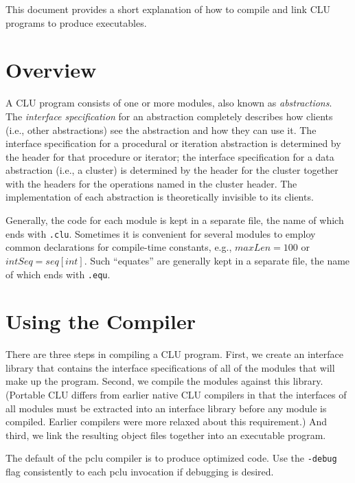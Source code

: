 \maketitle

\noindent This document provides a short explanation of how to compile
and link CLU programs to produce executables.

\section{Overview}

A CLU program consists of one or more modules, also known as {\em
abstractions}.  The {\em interface specification} for an abstraction
completely describes how clients (i.e., other abstractions) see the
abstraction and how they can use it.  The interface specification for
a procedural or iteration abstraction is determined by the header for
that procedure or iterator; the interface specification for a data
abstraction (i.e., a cluster) is determined by the header for the
cluster together with the headers for the operations named in the
cluster header.  The implementation of each abstraction is
theoretically invisible to its clients.

Generally, the code for each module is kept in a separate file, the
name of which ends with \verb|.clu|.  Sometimes it is convenient for
several modules to employ common declarations for compile-time
constants, e.g., $maxLen = 100$ or $intSeq = seq[int]$.  Such
``equates'' are generally kept in a separate file, the name of which
ends with \verb|.equ|.

\section{Using the Compiler}

There are three steps in compiling a CLU program. First, we create an
interface library that contains the interface specifications of all of
the modules that will make up the program. Second, we compile the
modules against this library. (Portable CLU differs from earlier
native CLU compilers in that the interfaces of all modules must be
extracted into an interface library before any module is compiled.
Earlier compilers were more relaxed about this requirement.)  And
third, we link the resulting object files together into an executable
program.

The default of the pclu compiler is to produce optimized code.  Use the
\verb|-debug| flag consistently to each pclu invocation if debugging is
desired.

